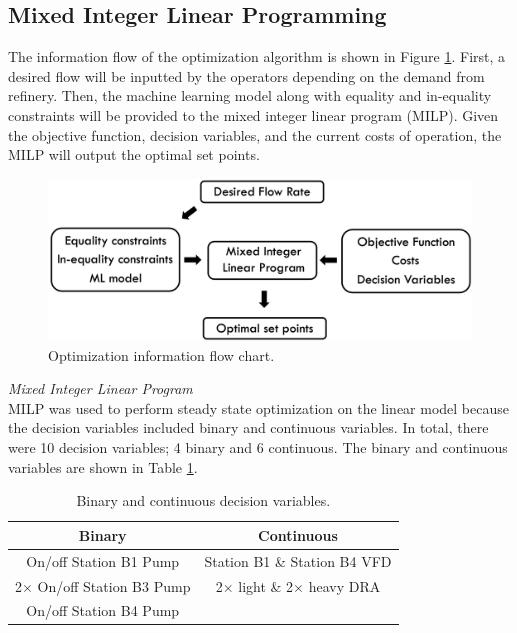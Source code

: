\subsection{Mixed Integer Linear Programming}
The information flow of the optimization algorithm is shown in Figure \ref{fig:08Optimization_flow}.  First, a desired flow will be inputted by the operators depending on the demand from refinery.  Then, the machine learning model along with equality and in-equality constraints will be provided to the mixed integer linear program (MILP).  Given the objective function, decision variables, and the current costs of operation, the MILP will output the optimal set points.
\begin{figure}[h]
    \centering
    \includegraphics[width=\textwidth]{images/suncor/08Optimization_flow.png}
    \caption{Optimization information flow chart.}
    \label{fig:08Optimization_flow}
\end{figure}

\noindent
\textit{Mixed Integer Linear Program} \\
MILP was used to perform steady state optimization on the linear model because the decision variables included binary and continuous variables.  In total, there were 10 decision variables; 4 binary and 6 continuous.  The binary and continuous variables are shown in Table \ref{tab:08binary_cont}.

\begin{table}[h]
    \centering
    {
    \begin{tabular}{ c | c }
        Binary                       &  Continuous           \\
        \hline
        On/off Station B1 Pump               &  Station B1 \& Station B4 VFD            \\
        2$\times$ On/off Station B3 Pump         &  2$\times$ light \& 2$\times$ heavy DRA  \\
        On/off Station B4 Pump
    \end{tabular}}
    \caption{Binary and continuous decision variables.}
    \label{tab:08binary_cont}
\end{table}

